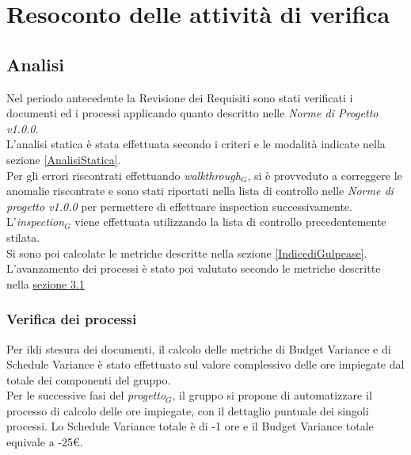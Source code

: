 \chapter{Resoconto delle attività di verifica}
\label{resoconto}
\section{Analisi}
Nel periodo antecedente la Revisione dei Requisiti sono stati verificati i documenti ed i processi applicando quanto descritto nelle \textit{Norme di Progetto v1.0.0}.\\
L'analisi statica è stata effettuata secondo i criteri e le modalità indicate nella sezione \ref{AnalisiStatica}.\\ 
Per gli errori riscontrati effettuando \textit{walkthrough$_{G}$}, si è provveduto a correggere le anomalie riscontrate e sono stati riportati nella lista di controllo nelle \textit{Norme di progetto v1.0.0} per permettere di effettuare inspection successivamente.\\
L'\textit{inspection$_{G}$} viene effettuata utilizzando la lista di controllo precedentemente stilata. \\
Si sono poi calcolate le metriche descritte nella sezione \ref{IndicediGulpease}.\\
L'avanzamento dei processi è stato poi valutato secondo le metriche descritte nella \hyperref[ProcessoMetriche]{sezione 3.1} 
\subsection{Verifica dei processi}
Per ildi stesura dei documenti, il calcolo delle metriche di Budget Variance e di Schedule Variance è stato effettuato sul valore complessivo delle ore impiegate dal totale dei componenti del gruppo.\\
Per le successive fasi del \textit{progetto$_{G}$}, il gruppo si propone di automatizzare il processo di calcolo delle ore impiegate, con il dettaglio puntuale dei singoli processi.
Lo Schedule Variance totale è di -1 ore e il Budget Variance totale equivale a -25\euro.

\\
